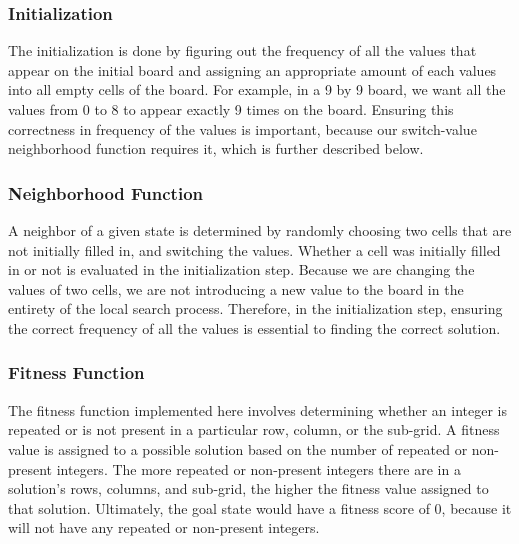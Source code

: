\documentclass[12pt, a4paper]{article}
\begin{document}
			\subsubsection{Initialization}
				The initialization is done by figuring out the frequency of all the values that appear on the initial board and assigning an appropriate amount of each values into all empty cells of the board. For example, in a 9 by 9 board, we want all the values from 0 to 8 to appear exactly 9 times on the board. Ensuring this correctness in  frequency of the values is important, because our switch-value neighborhood function requires it, which is further described below. 
			\subsubsection{Neighborhood Function}
				A neighbor of a given state is determined by randomly choosing two cells that are not initially filled in, and switching the values. Whether a cell was initially filled in or not is evaluated in the initialization step. Because we are changing the values of two cells, we are not introducing a new value to the board in the entirety of the local search process. Therefore, in the initialization step, ensuring the correct frequency of all the values is essential to finding the correct solution.
			\subsubsection{Fitness Function}
				The fitness function implemented here involves determining whether an integer is repeated or is not present in a particular row, column, or the sub-grid. A fitness value is assigned to a possible solution based on the number of repeated or non-present integers. The more repeated or non-present integers there are in a solution's rows, columns, and sub-grid, the higher the fitness value assigned to that solution. Ultimately, the goal state would have a fitness score of 0, because it will not have any repeated or non-present integers.
\end{document}
